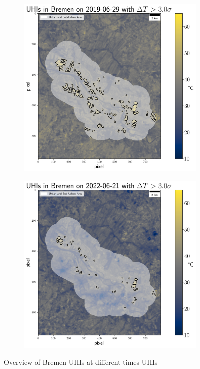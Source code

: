 \documentclass[12pt,a4paper, english,twoside]{article}
\begin{document}
   \begin{figure}[!p]
     \centering
       \begin{subfigure}[b]{0.48\textwidth}
          \includegraphics[width=\textwidth]{img/UHIs_Bremen_2019-06-29_s:3}
         \label{fig:uhis2019}
       \end{subfigure}
       \begin{subfigure}[b]{0.48\textwidth}
          \includegraphics[width=\textwidth]{img/UHIs_Bremen_2022-06-21_s:3}
         \label{fig:uhis2022}
       \end{subfigure}
         \caption{Overview of Bremen UHIs at different times \glspl{UHI}}\label{fig:AnalysisBre}
   \end{figure}
\end{document}
